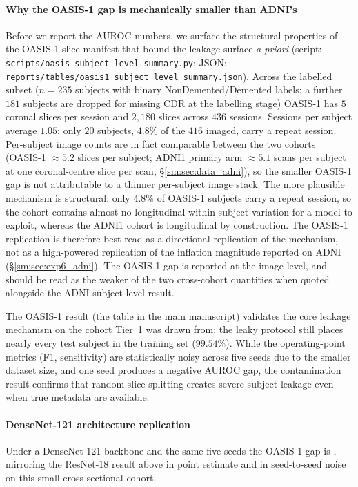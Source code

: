 \documentclass[11pt]{article}
\providecommand{\pb}{\discretionary{}{}{}}
\begin{document}
\paragraph{Why the OASIS-1 gap is mechanically smaller than ADNI's}
Before we report the AUROC numbers, we surface the structural
properties of the OASIS-1 slice manifest that bound the leakage
surface \emph{a priori} (script:
\texttt{scripts/\pb oasis\_subject\_level\_summary.py};
JSON: \texttt{reports/\pb tables/\pb oasis1\_subject\_level\_summary.json}).
Across the labelled subset ($n=235$ subjects with binary
NonDemented/Demented labels; a further $181$ subjects are dropped for
missing CDR at the labelling stage) OASIS-1 has $5$ coronal slices per
session and $2{,}180$ slices across $436$ sessions. Sessions per subject
average $1.05$: only $20$ subjects, $4.8\%$ of the $416$ imaged, carry a
repeat session. Per-subject image
counts are in fact comparable between the two cohorts (OASIS-1
$\approx 5.2$ slices per subject; ADNI1 primary arm $\approx 5.1$
scans per subject at one coronal-centre slice per scan,
\S\ref{sm:sec:data_adni}), so the smaller OASIS-1 gap is not
attributable to a thinner per-subject image stack. The more
plausible mechanism is structural: only $4.8\%$ of OASIS-1 subjects
carry a repeat session, so the cohort contains almost no
longitudinal within-subject variation for a model to exploit,
whereas the ADNI1 cohort is longitudinal by construction. The OASIS-1
replication is therefore best read as a directional replication of
the mechanism, not as a high-powered replication of the inflation
magnitude reported on ADNI (\S\ref{sm:sec:exp6_adni}). The OASIS-1 gap is reported at the image level, and should be read as
the weaker of the two cross-cohort quantities when quoted alongside the
ADNI subject-level result.



The OASIS-1 result (the table in the main manuscript) validates the
core leakage mechanism on the cohort Tier~1 was drawn from: the leaky
protocol still places nearly every test subject in the training set
($99.54\%$). While the operating-point metrics (F1, sensitivity) are
statistically noisy across five seeds due to the smaller dataset size,
and one seed produces a negative AUROC gap, the contamination result
confirms that random slice splitting creates severe subject leakage
even when true metadata are available.

\paragraph{DenseNet-121 architecture replication}
Under a DenseNet-121 backbone and the same five seeds the OASIS-1 gap
is \OasisDenseGap{}, mirroring the ResNet-18 result above in point
estimate and in seed-to-seed noise on this small cross-sectional
cohort.
\end{document}
